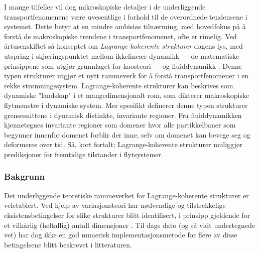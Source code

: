 I mange tilfeller vil dog mikroskopiske detaljer i de underliggende
transportfenomenene være uvesentlige i forhold til de overordnede tendensene
i systemet. Dette betyr at en mindre ambisiøs tilnærming, med hovedfokus på
å forstå de makroskopiske trendene i transportfenomenet, ofte er rimelig.
Ved årtusenskiftet så konseptet om \emph{Lagrange-koherente strukturer} dagens
lys, med utspring i skjæringspunktet mellom ikkelineær dynamikk --- de
matematiske prinsippene som utgjør grunnlaget for kaosteori --- og
fluiddynamikk \parencite{haller2000lagrangian}. Denne typen strukturer
utgjør et nytt rammeverk for å forstå transportfenomener i en rekke
strømningssystem. Lagrange-koherente strukturer kan beskrives som
dynamiske "landskap" i et mangedimensjonalt rom, som dikterer makroskopiske
flytmønstre i dynamiske system. Mer spesifikt definerer denne typen strukturer
grensesnittene i dynamisk distinkte, invariante regioner. Fra fluiddynamikken
kjennetegnes invariante regioner som domener hvor alle partikkelbaner som
begynner innenfor domenet forblir der inne, selv om domenet kan bevege seg
og deformeres over tid. Så, kort fortalt; Lagrange-koherente strukturer
muliggjør prediksjoner for fremtidige tilstander i flytsystemer.

\subsubsection*{Bakgrunn}

Det underliggende teoretiske rammeverket for Lagrange-koherente strukturer
er veletablert. Ved hjelp av variasjonsteori har nødvendige og
tilstrekkelige eksistensbetingelser for slike strukturer blitt identifisert,
i prinsipp gjeldende for et vilkårlig (heltallig) antall dimensjoner
\parencite{haller2010variational}. Til dags dato (og så vidt undertegnede vet)
har dog ikke en god numerisk implementasjonsmetode for flere av disse
betingelsene blitt beskrevet i litteraturen.

